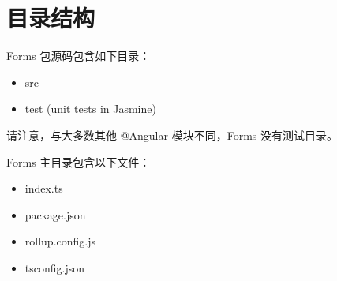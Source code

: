 \section{目录结构}


Forms 包源码包含如下目录：

\begin{itemize}
  \item src
  \item test (unit tests in Jasmine)
\end{itemize}


请注意，与大多数其他 @Angular 模块不同，Forms 没有测试目录。


Forms 主目录包含以下文件：

\begin{itemize}
  \item index.ts
  \item package.json
  \item rollup.config.js
  \item tsconfig.json
\end{itemize}
